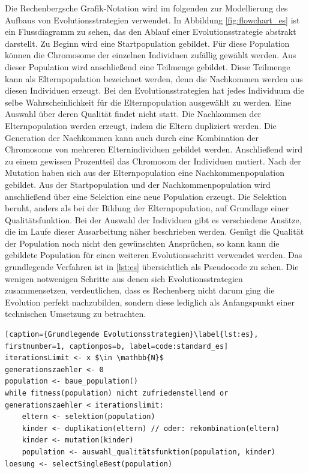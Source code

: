 Die Rechenbergsche Grafik-Notation wird im folgenden zur Modellierung des Aufbaus von Evolutionsstrategien verwendet. In Abbildung \ref{fig:flowchart_es} ist ein Flussdiagramm zu sehen, das den Ablauf einer Evolutionsstrategie abstrakt darstellt.
Zu Beginn wird eine Startpopulation gebildet. Für diese Population können die Chromosome der einzelnen Individuen zufällig gewählt werden. Aus dieser Population wird anschließend eine Teilmenge gebildet. Diese Teilmenge kann als Elternpopulation bezeichnet werden, denn die Nachkommen werden aus diesen Individuen erzeugt. Bei den Evolutionsstrategien hat jedes Individuum die selbe Wahrscheinlichkeit für die Elternpopulation ausgewählt zu werden. Eine Auswahl über deren Qualität findet nicht statt. Die Nachkommen der Elternpopulation werden erzeugt, indem die Eltern dupliziert werden. Die Generation der Nachkommen kann auch durch eine Kombination der Chromosome von mehreren Elternindividuen gebildet werden. Anschließend wird zu einem gewissen Prozentteil das Chromosom der Individuen mutiert. 
Nach der Mutation haben sich aus der Elternpopulation eine Nachkommenpopulation gebildet. Aus der Startpopulation und der Nachkommenpopulation wird anschließend über eine Selektion eine neue Population erzeugt. Die Selektion beruht, anders als bei der Bildung der Elternpopulation, auf Grundlage einer Qualitätsfunktion.
Bei der Auswahl der Individuen gibt es verschiedene Ansätze, die im Laufe dieser Ausarbeitung näher beschrieben werden. Genügt die Qualität der Population noch nicht den gewünschten Ansprüchen, so kann kann die gebildete Population für einen weiteren Evolutionsschritt verwendet werden.
Das grundlegende Verfahren ist in \ref{lst:es} übersichtlich als Pseudocode zu sehen. Die wenigen notwenigen Schritte aus denen sich Evolutionsstrategien zusammensetzen, verdeutlichen, dass es Rechenberg nicht darum ging die Evolution perfekt nachzubilden, sondern diese lediglich als Anfangspunkt einer technischen Umsetzung zu betrachten.
\begin{lstlisting}[caption={Grundlegende Evolutionsstrategien}\label{lst:es}, firstnumber=1, captionpos=b, label=code:standard_es]
iterationsLimit <- x $\in \mathbb{N}$
generationszaehler <- 0
population <- baue_population()
while fitness(population) nicht zufriedenstellend or generationszaehler < iterationslimit:
	eltern <- selektion(population)
	kinder <- duplikation(eltern) // oder: rekombination(eltern)
	kinder <- mutation(kinder)
	population <- auswahl_qualitätsfunktion(population, kinder)
loesung <- selectSingleBest(population)
\end{lstlisting}

